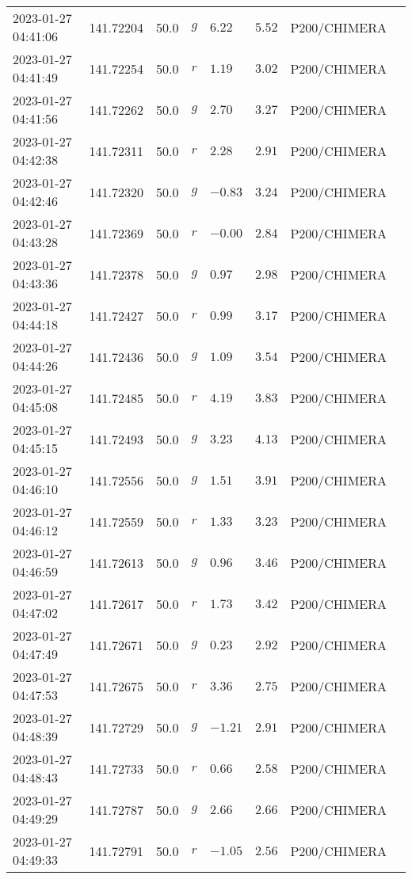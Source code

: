 \documentclass{nature_plusfigure}
\begin{document}
\begin{supplement}
\begin{center}
\begin{longtable}{llllllll}
2023-01-27 04:41:06 & 141.72204 & 50.0 & $g$ & $6.22$ & $5.52$ & P200/CHIMERA &  \\ 
2023-01-27 04:41:49 & 141.72254 & 50.0 & $r$ & $1.19$ & $3.02$ & P200/CHIMERA &  \\ 
2023-01-27 04:41:56 & 141.72262 & 50.0 & $g$ & $2.70$ & $3.27$ & P200/CHIMERA &  \\ 
2023-01-27 04:42:38 & 141.72311 & 50.0 & $r$ & $2.28$ & $2.91$ & P200/CHIMERA &  \\ 
2023-01-27 04:42:46 & 141.72320 & 50.0 & $g$ & $-0.83$ & $3.24$ & P200/CHIMERA &  \\ 
2023-01-27 04:43:28 & 141.72369 & 50.0 & $r$ & $-0.00$ & $2.84$ & P200/CHIMERA &  \\ 
2023-01-27 04:43:36 & 141.72378 & 50.0 & $g$ & $0.97$ & $2.98$ & P200/CHIMERA &  \\ 
2023-01-27 04:44:18 & 141.72427 & 50.0 & $r$ & $0.99$ & $3.17$ & P200/CHIMERA &  \\ 
2023-01-27 04:44:26 & 141.72436 & 50.0 & $g$ & $1.09$ & $3.54$ & P200/CHIMERA &  \\ 
2023-01-27 04:45:08 & 141.72485 & 50.0 & $r$ & $4.19$ & $3.83$ & P200/CHIMERA &  \\ 
2023-01-27 04:45:15 & 141.72493 & 50.0 & $g$ & $3.23$ & $4.13$ & P200/CHIMERA &  \\ 
2023-01-27 04:46:10 & 141.72556 & 50.0 & $g$ & $1.51$ & $3.91$ & P200/CHIMERA &  \\ 
2023-01-27 04:46:12 & 141.72559 & 50.0 & $r$ & $1.33$ & $3.23$ & P200/CHIMERA &  \\ 
2023-01-27 04:46:59 & 141.72613 & 50.0 & $g$ & $0.96$ & $3.46$ & P200/CHIMERA &  \\ 
2023-01-27 04:47:02 & 141.72617 & 50.0 & $r$ & $1.73$ & $3.42$ & P200/CHIMERA &  \\ 
2023-01-27 04:47:49 & 141.72671 & 50.0 & $g$ & $0.23$ & $2.92$ & P200/CHIMERA &  \\ 
2023-01-27 04:47:53 & 141.72675 & 50.0 & $r$ & $3.36$ & $2.75$ & P200/CHIMERA &  \\ 
2023-01-27 04:48:39 & 141.72729 & 50.0 & $g$ & $-1.21$ & $2.91$ & P200/CHIMERA &  \\ 
2023-01-27 04:48:43 & 141.72733 & 50.0 & $r$ & $0.66$ & $2.58$ & P200/CHIMERA &  \\ 
2023-01-27 04:49:29 & 141.72787 & 50.0 & $g$ & $2.66$ & $2.66$ & P200/CHIMERA &  \\ 
2023-01-27 04:49:33 & 141.72791 & 50.0 & $r$ & $-1.05$ & $2.56$ & P200/CHIMERA &  \\ 

\end{longtable}
\end{center}
\end{supplement}
\end{document}
